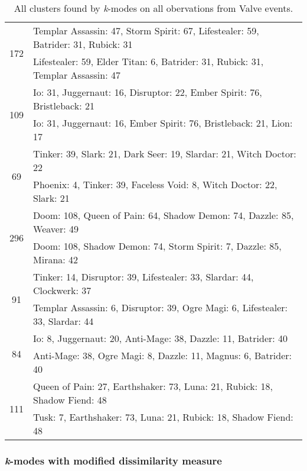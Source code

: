 \documentclass[result.tex]{subfiles}
\begin{document}
\begin{table}[H]
\begin{tabular}{ | c | p{12.5cm} | }
    \hline
    \multirow{2}{*}{172}
    & Templar Assassin: 47, Storm Spirit: 67, Lifestealer: 59, Batrider: 31, Rubick: 31 \\
    & Lifestealer: 59, Elder Titan: 6, Batrider: 31, Rubick: 31, Templar Assassin: 47 \\
    \hline
    \multirow{2}{*}{109}
    & Io: 31, Juggernaut: 16, Disruptor: 22, Ember Spirit: 76, Bristleback: 21 \\
    & Io: 31, Juggernaut: 16, Ember Spirit: 76, Bristleback: 21, Lion: 17 \\
    \hline
    \multirow{2}{*}{69}
    & Tinker: 39, Slark: 21, Dark Seer: 19, Slardar: 21, Witch Doctor: 22 \\
    & Phoenix: 4, Tinker: 39, Faceless Void: 8, Witch Doctor: 22, Slark: 21 \\
    \hline
    \multirow{2}{*}{296}
    & Doom: 108, Queen of Pain: 64, Shadow Demon: 74, Dazzle: 85, Weaver: 49 \\
    & Doom: 108, Shadow Demon: 74, Storm Spirit: 7, Dazzle: 85, Mirana: 42 \\
    \hline
    \multirow{2}{*}{91}
    & Tinker: 14, Disruptor: 39, Lifestealer: 33, Slardar: 44, Clockwerk: 37 \\
    & Templar Assassin: 6, Disruptor: 39, Ogre Magi: 6, Lifestealer: 33, Slardar: 44 \\
    \hline
    \multirow{2}{*}{84}
    & Io: 8, Juggernaut: 20, Anti-Mage: 38, Dazzle: 11, Batrider: 40 \\
    & Anti-Mage: 38, Ogre Magi: 8, Dazzle: 11, Magnus: 6, Batrider: 40 \\
    \hline
    \multirow{2}{*}{111}
    & Queen of Pain: 27, Earthshaker: 73, Luna: 21, Rubick: 18, Shadow Fiend: 48 \\
    & Tusk: 7, Earthshaker: 73, Luna: 21, Rubick: 18, Shadow Fiend: 48 \\
    \hline
  \end{tabular}
  \caption{All clusters found by \textit{k}-modes on all obervations from Valve events.}
  \label{tab:cl_app_all_kmodes}
\end{table}

\subsubsection*{\textit{k}-modes with modified dissimilarity measure}
\end{document}
